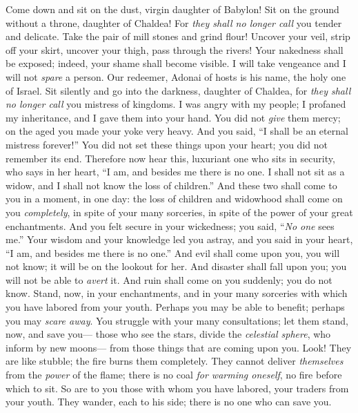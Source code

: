 \begin{biblechapter} %
 Come down and sit on the dust, virgin daughter of Babylon! 
Sit on the ground without a throne, daughter of Chaldea! 
For \textit{they shall no longer call} you tender and delicate.
\verse Take the pair of mill stones and grind flour! 
Uncover your veil, 
strip off your skirt, 
uncover your thigh, 
pass through the rivers!
\verse Your nakedness shall be exposed; 
indeed, your shame shall become visible. 
I will take vengeance 
and I will not \textit{spare} a person.
\verse Our redeemer, Adonai of hosts is his name, the holy one of Israel.
\verse Sit silently and go into the darkness, daughter of Chaldea, 
for \textit{they shall no longer call} you mistress of kingdoms.
\verse I was angry with my people; 
I profaned my inheritance, 
and I gave them into your hand. 
You did not \textit{give} them mercy; 
on the aged you made your yoke very heavy.
\verse And you said, “I shall be an eternal mistress forever!” 
You did not set these things upon your heart; 
you did not remember its end.
\verse Therefore now hear this, luxuriant one who sits in security, 
who says in her heart, “I am, and besides me there is no one. 
I shall not sit as a widow, 
and I shall not know the loss of children.”
\verse And these two shall come to you in a moment, in one day: 
the loss of children and widowhood shall come on you \textit{completely}, 
in spite of your many sorceries, 
in spite of the power of your great enchantments.
\verse And you felt secure in your wickedness; 
you said, “\textit{No one} sees me.” 
Your wisdom and your knowledge led you astray, 
and you said in your heart, “I am, and besides me there is no one.”
\verse And evil shall come upon you, you will not know; 
it will be on the lookout for her. 
And disaster shall fall upon you; you will not be able to \textit{avert} it. 
And ruin shall come on you suddenly; you do not know.
\verse Stand, now, in your enchantments, 
and in your many sorceries with which you have labored from your youth. 
Perhaps you may be able to benefit; 
perhaps you may \textit{scare away}.
\verse You struggle with your many consultations; 
let them stand, now, and save you— 
those who see the stars, divide the \textit{celestial sphere}, 
who inform by new moons— 
from those things that are coming upon you.
\verse Look! They are like stubble; 
the fire burns them completely. 
They cannot deliver \textit{themselves} from the \textit{power} of the flame; 
there is no coal \textit{for warming oneself}, 
no fire before which to sit.
\verse So are to you those with whom you have labored, 
your traders from your youth. 
They wander, each to his side; 
there is no one who can save you.
\end{biblechapter}

